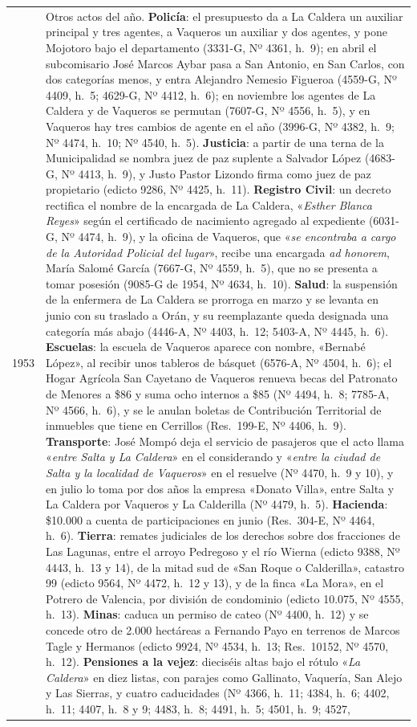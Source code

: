 \begin{longtable}{@{}p{2.7cm}p{10.3cm}@{}}
1953 & Otros actos del año. \textbf{Policía}: el presupuesto da a La Caldera un auxiliar principal y tres agentes, a Vaqueros un auxiliar y dos agentes, y pone Mojotoro bajo el departamento (3331-G, Nº 4361, h.\ 9); en abril el subcomisario José Marcos Aybar pasa a San Antonio, en San Carlos, con dos categorías menos, y entra Alejandro Nemesio Figueroa (4559-G, Nº 4409, h.\ 5; 4629-G, Nº 4412, h.\ 6); en noviembre los agentes de La Caldera y de Vaqueros se permutan (7607-G, Nº 4556, h.\ 5), y en Vaqueros hay tres cambios de agente en el año (3996-G, Nº 4382, h.\ 9; Nº 4474, h.\ 10; Nº 4540, h.\ 5). \textbf{Justicia}: a partir de una terna de la Municipalidad se nombra juez de paz suplente a Salvador López (4683-G, Nº 4413, h.\ 9), y Justo Pastor Lizondo firma como juez de paz propietario (edicto 9286, Nº 4425, h.\ 11). \textbf{Registro Civil}: un decreto rectifica el nombre de la encargada de La Caldera, «\textit{Esther Blanca Reyes}» según el certificado de nacimiento agregado al expediente (6031-G, Nº 4474, h.\ 9), y la oficina de Vaqueros, que «\textit{se encontraba a cargo de la Autoridad Policial del lugar}», recibe una encargada \textit{ad honorem}, María Salomé García (7667-G, Nº 4559, h.\ 5), que no se presenta a tomar posesión (9085-G de 1954, Nº 4634, h.\ 10). \textbf{Salud}: la suspensión de la enfermera de La Caldera se prorroga en marzo y se levanta en junio con su traslado a Orán, y su reemplazante queda designada una categoría más abajo (4446-A, Nº 4403, h.\ 12; 5403-A, Nº 4445, h.\ 6). \textbf{Escuelas}: la escuela de Vaqueros aparece con nombre, «Bernabé López», al recibir unos tableros de básquet (6576-A, Nº 4504, h.\ 6); el Hogar Agrícola San Cayetano de Vaqueros renueva becas del Patronato de Menores a \$86 y suma ocho internos a \$85 (Nº 4494, h.\ 8; 7785-A, Nº 4566, h.\ 6), y se le anulan boletas de Contribución Territorial de inmuebles que tiene en Cerrillos (Res.\ 199-E, Nº 4406, h.\ 9). \textbf{Transporte}: José Mompó deja el servicio de pasajeros que el acto llama «\textit{entre Salta y La Caldera}» en el considerando y «\textit{entre la ciudad de Salta y la localidad de Vaqueros}» en el resuelve (Nº 4470, h.\ 9 y 10), y en julio lo toma por dos años la empresa «Donato Villa», entre Salta y La Caldera por Vaqueros y La Calderilla (Nº 4479, h.\ 5). \textbf{Hacienda}: \$10.000 a cuenta de participaciones en junio (Res.\ 304-E, Nº 4464, h.\ 6). \textbf{Tierra}: remates judiciales de los derechos sobre dos fracciones de Las Lagunas, entre el arroyo Pedregoso y el río Wierna (edicto 9388, Nº 4443, h.\ 13 y 14), de la mitad sud de «San Roque o Calderilla», catastro 99 (edicto 9564, Nº 4472, h.\ 12 y 13), y de la finca «La Mora», en el Potrero de Valencia, por división de condominio (edicto 10.075, Nº 4555, h.\ 13). \textbf{Minas}: caduca un permiso de cateo (Nº 4400, h.\ 12) y se concede otro de 2.000 hectáreas a Fernando Payo en terrenos de Marcos Tagle y Hermanos (edicto 9924, Nº 4534, h.\ 13; Res.\ 10152, Nº 4570, h.\ 12). \textbf{Pensiones a la vejez}: dieciséis altas bajo el rótulo «\textit{La Caldera}» en diez listas, con parajes como Gallinato, Vaquería, San Alejo y Las Sierras, y cuatro caducidades (Nº 4366, h.\ 11; 4384, h.\ 6; 4402, h.\ 11; 4407, h.\ 8 y 9; 4483, h.\ 8; 4491, h.\ 5; 4501, h.\ 9; 4527, 
\end{longtable}
